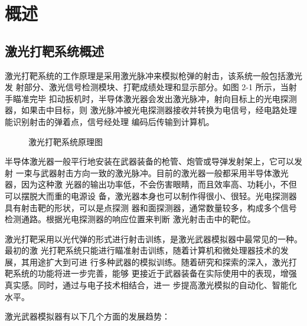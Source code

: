 \chapter{概述}

\section{激光打靶系统概述}

激光打靶系统\cite{cn1,cn2,cn3}的工作原理是采用激光脉冲来模拟枪弹的射击，该系统一般包括激光发
射部分、激光信号检测模块、打靶成绩处理和显示部分。如图 2-1 所示，当射手瞄准完毕
扣动扳机时，半导体激光器会发出激光脉冲，射向目标上的光电探测器，如果击中目标，则
激光脉冲被光电探测器接收并转换为电信号，经电路处理能识别射击的弹着点，信号经处理
编码后传输到计算机。

\begin{figure}[htbp]
  \centering
  \caption{激光打靶系统原理图}
\end{figure}

半导体激光器\cite{cn4,en5}一般平行地安装在武器装备的枪管、炮管或导弹发射架上，它可以发射
一束与武器射击方向一致的激光脉冲。目前的激光器一般都采用半导体激光器，因为这种激
光器的输出功率低，不会伤害眼睛，而且效率高、功耗小，不但可以摆脱大而重的电源设
备，激光器本身也可以制作得很小、很轻。光电探测器\cite{en6}具有射击靶的形状，可以是点探测
器和面探测器，通常数量较多，构成多个信号检测通路。根据光电探测器的响应位置来判断
激光射击击中的靶位。

激光打靶采用以光代弹的形式进行射击训练，是激光武器模拟器中最常见的一种。最初的激
光打靶系统只能进行瞄准射击训练，随着计算机和微处理器技术的发展，其用途扩大到可进
行多种武器的模拟训练。随着研究和探索的深入，激光打靶系统的功能将进一步完善，能够
更接近于武器装备在实际使用中的表现，增强真实感。同时，通过与电子技术相结合，进一
步提高激光模拟的自动化、智能化水平。

激光武器模拟器有以下几个方面的发展趋势：

